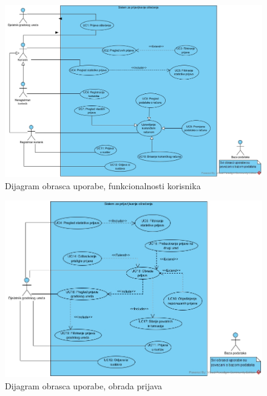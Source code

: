 					\begin{figure}[H]
						\includegraphics[width=\textwidth]{slike/Funkcionalnosti_korisnikaUCD.jpg} %
						\caption{Dijagram obrasca uporabe, funkcionalnosti korisnika}
						\label{fig:dijagramObrascaUporabe1} %
					\end{figure}
					
					\begin{figure}[H]
						\includegraphics[width=\textwidth]{slike/Obrada_prijavaUCD.jpg} %
						\caption{Dijagram obrasca uporabe, obrada prijava}
						\label{fig:dijagramObrascaUporabe2} %
					\end{figure}
					
				\eject		
				
